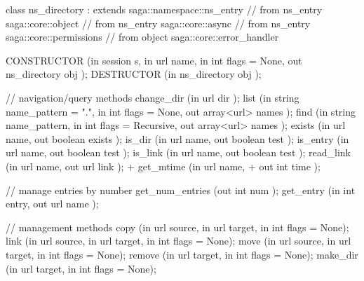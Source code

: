 \begin{myspec}
{ 
    class ns_directory : extends           saga::namespace::ns_entry
                         // from ns_entry  saga::core::object
                         // from ns_entry  saga::core::async
                         // from ns_entry  saga::core::permissions
                         // from object    saga::core::error_handler
    {
      CONSTRUCTOR        (in  session        s,
                          in  url            name,
                          in  int            flags = None,
                          out ns_directory   obj     );
      DESTRUCTOR         (in  ns_directory   obj     );
 
      // navigation/query methods
      change_dir         (in  url            dir     );
      list               (in  string         name_pattern = ".",
                          in  int            flags   = None, 
                          out array<url>     names   );
      find               (in  string         name_pattern,
                          in  int            flags = Recursive,
                          out array<url>     names   );
      exists             (in  url            name,
                          out boolean        exists  );
      is_dir             (in  url            name,
                          out boolean        test    );
      is_entry           (in  url            name,
                          out boolean        test    );
      is_link            (in  url            name,
                          out boolean        test    );
      read_link          (in  url            name,
                          out url            link    );
+     get_mtime          (in  url            name,
+                         out int            time    );
 
      // manage entries by number
      get_num_entries    (out int            num     );
      get_entry          (in  int            entry,
                          out url            name    );
 
      // management methods
      copy               (in  url            source,
                          in  url            target,
                          in  int            flags = None);
      link               (in  url            source,
                          in  url            target,
                          in  int            flags = None);
      move               (in  url            source,
                          in  url            target,
                          in  int            flags = None);
      remove             (in  url            target,
                          in  int            flags = None);
      make_dir           (in  url            target,
                          in  int            flags = None);
 
}}
\end{myspec}
